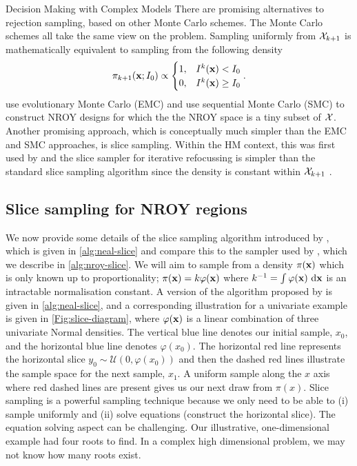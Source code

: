 \begin{chapter}{Decision Making with Complex Models \label{Chap:optimisation}}
There are promising alternatives to rejection sampling, based on other Monte Carlo schemes. The Monte Carlo schemes all take the same view on the problem. Sampling uniformly from $\mathcal{X}_{k+1}$ is mathematically equivalent to sampling from the following density
\begin{equation}
 \pi_{k+1}(\mathbf{x}; I_0) \propto \begin{cases}
  1, & I^k(\mathbf{x}) < I_0\\
  0, & I^k(\mathbf{x}) \geq I_0
 \end{cases}.
\end{equation}
 \citet{Williamson2013} use evolutionary Monte Carlo (EMC) and \citet{Drovandi2021} use sequential Monte Carlo (SMC) to construct NROY designs for which the the NROY space is a tiny subset of $\mathcal{X}$. Another promising approach, which is conceptually much simpler than the EMC and SMC approaches, is slice sampling. Within the HM context, this was first used by \citet{Andrianakis2017a} and the slice sampler for iterative refocussing is simpler than the standard slice sampling algorithm since the density is constant within $\mathcal{X}_{k+1}$ \citep{Neal2003}.

\subsection{Slice sampling for NROY regions}

We now provide some details of the slice sampling algorithm introduced by \citet{Neal2003}, which is given in \cref{alg:neal-slice} and compare this to the sampler used by \citet{Andrianakis2017a}, which we describe in \cref{alg:nroy-slice}. We will aim to sample from a density $\pi(\mathbf{x})$ which is only known up to proportionality; $\pi(\mathbf{x}) = k \varphi(\mathbf{x})$ where $k^{-1} = \int \varphi(\mathbf{x}) \, \mathop{}\!\mathrm{d} \mathbf{x}$ is an intractable normalisation constant. A version of the algorithm proposed by \citet{Neal2003} is given in \cref{alg:neal-slice}, and a corresponding illustration for a univariate example is given in \cref{Fig:slice-diagram}, where $\varphi(\mathbf{x})$ is a linear combination of three univariate Normal densities. The vertical blue line denotes our initial sample, $x_0$, and the horizontal blue line denotes $\varphi(x_0)$. The horizontal red line represents the horizontal slice $y_0 \sim \mathcal{U}(0, \varphi(x_0))$ and then the dashed red lines illustrate the sample space for the next sample, $x_1$. A uniform sample along the $x$ axis where red dashed lines are present gives us our next draw from $\pi(x)$. Slice sampling is a powerful sampling technique because we only need to be able to (i) sample uniformly and (ii) solve equations (construct the horizontal slice). The equation solving aspect can be challenging. Our illustrative, one-dimensional example had four roots to find. In a complex high dimensional problem, we may not know how many roots exist.


\end{chapter}

